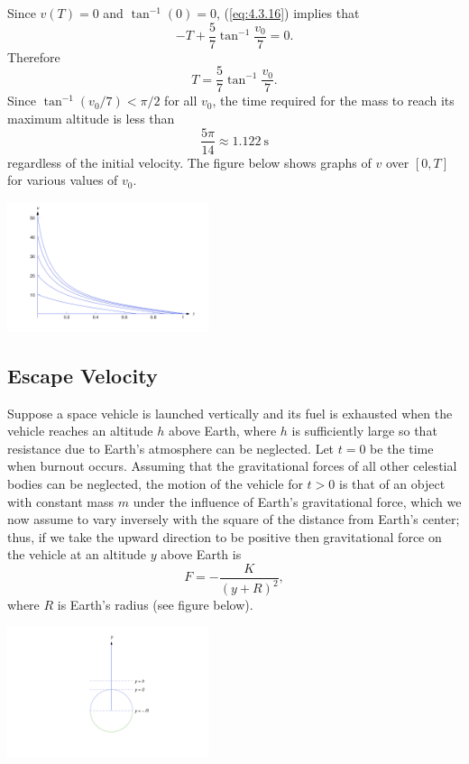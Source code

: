 \documentclass{ximera}
\begin{document}
\begin{example}
\begin{explanation}
 Since $v(T)=0$ and $\tan^{-1}(0)=0$, (\ref{eq:4.3.16}) implies that
$$
-T+\frac{5}{7} \tan^{-1}\frac{v_0}{7}=0.
$$
Therefore
$$
T=\frac{5}{7} \tan^{-1}\frac{v_0}{7}.
$$
Since $\tan^{-1}(v_0/7)<\pi/2$ for all $v_0$,
the  time required for the mass to reach its maximum
altitude is less than
$$
\frac{5\pi}{14} \approx 1.122\  \mbox{s}
$$
regardless of the initial velocity.  The figure below
shows graphs of $v$ over $[0,T]$ for various values of $v_0$.

\begin{image}
  \includegraphics[height=1.5in]{fig040304.jpg} 
\end{image}
\end{explanation}
\end{example}

\subsection*{Escape Velocity}

Suppose a space vehicle is launched vertically and its fuel is
exhausted when the vehicle reaches an altitude $h$ above Earth, where
$h$ is sufficiently large so that resistance due to Earth's atmosphere
can be neglected. Let $t=0$ be the time when burnout occurs.
Assuming that the gravitational forces of all other celestial bodies
can be neglected, the motion of the vehicle for $t > 0$ is that of an
object with constant mass $m$ under the influence of Earth's
gravitational force, which we now assume to vary inversely with the
square of the distance from Earth's center;  thus, if we take the
upward direction to be positive then
gravitational force on the vehicle at an altitude $y$ above Earth is
\begin{equation} \label{eq:4.3.18}
F=-\frac{K}{(y+R)^2},
\end{equation}
where $R$ is  Earth's radius (see figure below).

\begin{image}
  \includegraphics[height=1.5in]{fig040305.jpg} 
\end{image}
\end{document}

